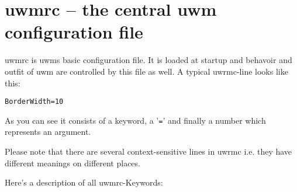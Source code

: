\documentclass[10pt,a4paper]{article}
\newcommand{\uwm}{{\sc uwm} }
\begin{document}
\section{\textsf{uwmrc} -- the central \uwm configuration file}
\textsf{uwmrc} is uwms basic configuration file. It is loaded at startup and behavoir and outfit of \uwm are controlled by this file as well. A typical \textsf{uwrmc}-line looks like this:

\texttt{BorderWidth=10}

As you can see it consists of a keyword, a '\texttt{=}' and finally a number which represents an argument.

Please note that there are several context-sensitive lines in \textsf{uwrmc} i.e. they have different meanings on different places.

Here's a description of all \textsf{uwmrc}-Keywords:
\end{document}

